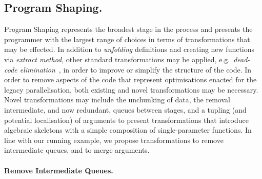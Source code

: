 

\subsection{Program Shaping.}
\label{sec:refac:shaping}

Program Shaping represents the broadest stage in the process and presents the programmer with the largest range of choices in terms of transformations that may be effected. In addition to \emph{unfolding} definitions and creating new functions via \emph{extract method}, other standard transformations may be applied, e.g.\ \emph{dead-code elimination}~\cite{Kennedy:DeadCodeElimination}, in order to improve or simplify the structure of the code. In order to remove aspects of the code that represent optimisations enacted for the legacy parallelisation, both existing and novel transformations may be necessary. Novel transformations may include the unchunking of data, the removal intermediate, and now redundant, queues between stages, and a tupling (and potential localisation) of arguments to present transformations that introduce algebraic skeletons with a simple composition of single-parameter functions. In line with our running example, we propose transformations to remove intermediate queues, and to merge arguments.

\paragraph{Remove Intermediate Queues.}

